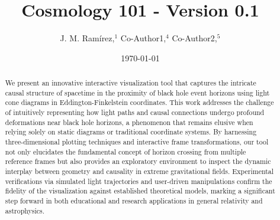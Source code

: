 \documentclass{article}
\title{Cosmology 101 - Version 0.1}
\author{J. M. Ram{\'i}rez,$^{1}$ Co-Author1,$^{4}$ Co-Author2,$^{5}$}
\date{\today}
\begin{document}
\maketitle

 \begin{abstract}

We present an innovative interactive visualization tool that captures the intricate causal structure of spacetime in the proximity of black hole event horizons using light cone diagrams in Eddington-Finkelstein coordinates. This work addresses the challenge of intuitively representing how light paths and causal connections undergo profound deformations near black hole horizons, a phenomenon that remains elusive when relying solely on static diagrams or traditional coordinate systems. By harnessing three-dimensional plotting techniques and interactive frame transformations, our tool not only elucidates the fundamental concept of horizon crossing from multiple reference frames but also provides an exploratory environment to inspect the dynamic interplay between geometry and causality in extreme gravitational fields. Experimental verifications via simulated light trajectories and user-driven manipulations confirm the fidelity of the visualization against established theoretical models, marking a significant step forward in both educational and research applications in general relativity and astrophysics.

 \end{abstract}
\end{document}
